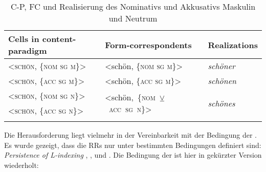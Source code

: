 \begin{exe}
\begin{exe}

\begin{table}
\caption{Flexion der lateinischen Verben \textit{fat\=er\=\i} und \textit{mon\=ere}, \citet[122]{AckermanStump2004}}\label{table4.9}
\end{table}


\begin{table}
\caption{C-P, FC und Realisierung des Nominativs und Akkusativs Maskulin und Neutrum}\label{table4.10}
\begin{tabular}{lll}
\lsptoprule
{Cells in content-paradigm} & {Form-correspondents} & {Realizations}\\
\midrule
<\textsc{schön}, \{\textsc{nom sg m}\}> & <schön, \{\textsc{nom sg m}\}> & \textit{schöner}\\
\midrule
<\textsc{schön}, \{\textsc{acc sg m}\}> & <schön, \{\textsc{acc sg m}\}> & \textit{schönen}\\
\midrule
<\textsc{schön}, \{\textsc{nom sg n}\}> & \multirow{2}{*}{\mbox{<schön, \{\textsc{nom} {\tiny ${\veebar}$} \textsc{acc sg n}\}>}} & \multirow{2}{*}{\textit{schönes}}\\\cmidrule(r){1-1}
<\textsc{schön}, \{\textsc{acc sg n}\}> &  & \\
\lspbottomrule
\end{tabular}
\end{table}

Die Herausforderung liegt vielmehr in der Vereinbarkeit mit der Bedingung der . Es wurde gezeigt, dass die RRs nur unter bestimmten Bedingungen definiert sind: \textit{Persistence of L-indexing} ,  ,   und  . Die Bedingung der  ist hier in gekürzter Version wiederholt:


\end{exe}
\end{exe}
